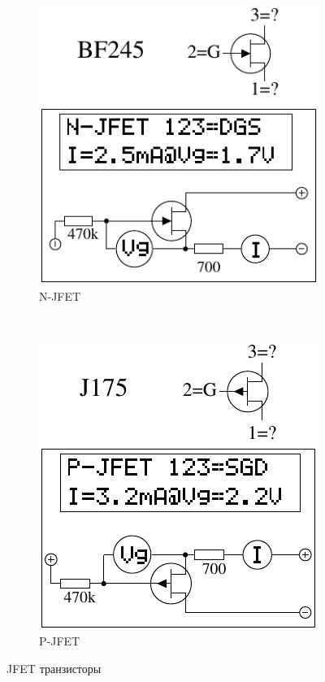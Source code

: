 \begin{figure}[H]
  \begin{subfigure}[b]{.5\textwidth}
    \centering
    \includegraphics[width=1.\textwidth]{../FIG/JFET_BF245.pdf}
    \caption{N-JFET}
    \label{fig:N-JFET}
  \end{subfigure}
  ~
  \begin{subfigure}[b]{.5\textwidth}
    \centering
    \includegraphics[width=1.\textwidth]{../FIG/JFET_J175.pdf}
    \caption{P-JFET}
    \label{fig:P-JFET}
  \end{subfigure}
  \caption{JFET транзисторы}
\end{figure}



